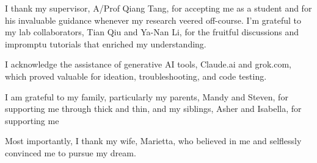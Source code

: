 I thank my supervisor, A/Prof Qiang Tang, for accepting me as a student and for his invaluable guidance whenever my research veered off-course. I'm grateful to my lab collaborators, Tian Qiu and Ya-Nan Li, for the fruitful discussions and impromptu tutorials that enriched my understanding. 

I acknowledge the assistance of generative AI tools, Claude.ai and grok.com, which proved valuable for ideation, troubleshooting, and code testing.

I am grateful to my family, particularly my parents, Mandy and Steven, for supporting me through thick and thin, and my siblings, Asher and Isabella, for supporting me 

Most importantly, I thank my wife, Marietta, who believed in me and selflessly convinced me to pursue my dream.